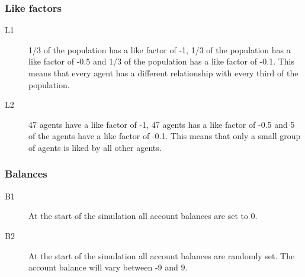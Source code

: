 \documentclass[twoside,openright]{uva-bachelor-thesis}
\begin{document}
\subsubsection{Like factors}
\begin{description}
\item[L1]	1/3 of the population has a like factor of -1, 1/3 of the population has a like factor of -0.5 and 1/3 of the population has a like factor of -0.1. This means that every agent has a different relationship with every third of the population.
\item[L2]	47 agents have a like factor of -1, 47 agents has a like factor of -0.5 and 5 of the agents have a like factor of -0.1. This means that only a small group of agents is liked by all other agents.
\end{description}
\subsubsection{Balances}
\begin{description}
\item[B1]	At the start of the simulation all account balances are set to 0.
\item[B2]	At the start of the simulation all account balances are randomly set. The account balance will vary between -9 and 9.
\end{description}
\end{document}
